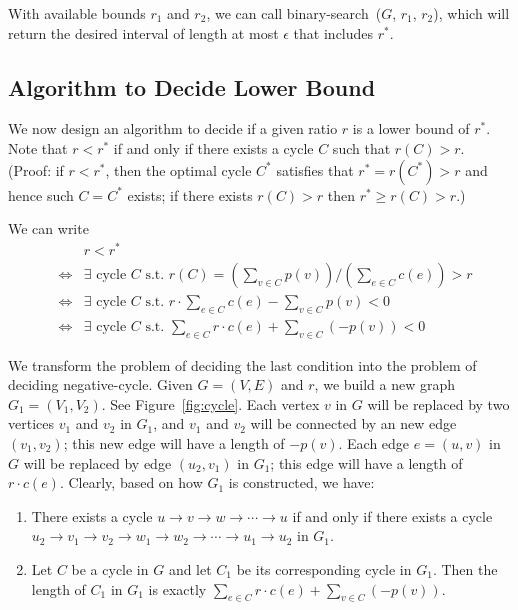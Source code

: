 \begin{algorithmblock}[0.8\textwidth]
	\xxx
	\aab {if $b - a \le \epsilon$: report interval $(a,b]$ and exit;}\xxx
	\xxx
	\xxx
	\xxx
	\xxx
\end{algorithmblock}

With available bounds $r_1$ and $r_2$, we can call binary-search~($G$, $r_1$, $r_2$), which will return
the desired interval of length at most $\epsilon$ that includes $r^*$.


\subsection*{Algorithm to Decide Lower Bound}

We now design an algorithm to decide if a given ratio $r$ is a lower bound of $r^*$.
Note that $r < r^*$ if and only if there exists a cycle $C$ such that $r(C) > r$.
(Proof: if $r < r^*$, then the optimal cycle $C^*$ satisfies that $r^* = r(C^*) > r$ and hence such $C = C^*$ exists;
if there exists $r(C) > r$ then $r^* \ge r(C) > r$.)

We can write
\begin{eqnarray*}
& & r < r^* \\
& \Longleftrightarrow & \exists \textrm{ cycle } C \textrm{ s.t.\ } \textstyle r(C) = (\sum_{v\in C} p(v)) / (\sum_{e\in C} c(e)) > r \\
& \Longleftrightarrow & \exists \textrm{ cycle } C \textrm{ s.t.\ } \textstyle r\cdot \sum_{e\in C} c(e) - \sum_{v\in C} p(v) < 0\\
& \Longleftrightarrow & \exists \textrm{ cycle } C \textrm{ s.t.\ } \textstyle \sum_{e\in C} r\cdot c(e) + \sum_{v\in C} (-p(v)) < 0
\end{eqnarray*}

We transform the problem of deciding the last condition into the problem of deciding negative-cycle.
Given $G = (V, E)$ and $r$, we build a new graph $G_1 = (V_1, V_2)$. See Figure~\ref{fig:cycle}.
Each vertex $v$ in $G$ will be replaced by two vertices $v_1$ and $v_2$ in $G_1$, and $v_1$ and $v_2$ will be connected by an new
edge $(v_1, v_2)$; this new edge will have a length of $-p(v)$. 
Each edge $e = (u,v)$ in $G$ will be replaced by edge $(u_2, v_1)$ in $G_1$; this edge will have a length of $r\cdot c(e)$.
Clearly, based on how $G_1$ is constructed, we have:
\begin{enumerate}
\item There exists a cycle $u \to v \to w \to \cdots \to u$ if and only if there exists a cycle $u_2 \to v_1 \to v_2 \to w_1 \to w_2 \to \cdots \to u_1 \to u_2$ in $G_1$.
\item Let $C$ be a cycle in $G$ and let $C_1$ be its corresponding cycle in $G_1$. Then the length of $C_1$ in $G_1$ is 
exactly $\sum_{e\in C} r\cdot c(e) + \sum_{v\in C} (-p(v))$.
\end{enumerate}

